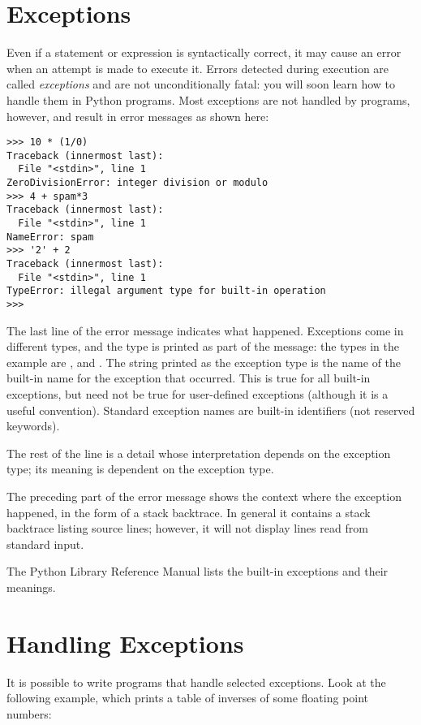 \section{Exceptions}

Even if a statement or expression is syntactically correct, it may
cause an error when an attempt is made to execute it.
Errors detected during execution are called \emph{exceptions} and are
not unconditionally fatal: you will soon learn how to handle them in
Python programs.  Most exceptions are not handled by programs,
however, and result in error messages as shown here:

\bcode\small\begin{verbatim}
>>> 10 * (1/0)
Traceback (innermost last):
  File "<stdin>", line 1
ZeroDivisionError: integer division or modulo
>>> 4 + spam*3
Traceback (innermost last):
  File "<stdin>", line 1
NameError: spam
>>> '2' + 2
Traceback (innermost last):
  File "<stdin>", line 1
TypeError: illegal argument type for built-in operation
>>> 
\end{verbatim}\normalsize\ecode
%
The last line of the error message indicates what happened.
Exceptions come in different types, and the type is printed as part of
the message: the types in the example are
,
and
.
The string printed as the exception type is the name of the built-in
name for the exception that occurred.  This is true for all built-in
exceptions, but need not be true for user-defined exceptions (although
it is a useful convention).
Standard exception names are built-in identifiers (not reserved
keywords).

The rest of the line is a detail whose interpretation depends on the
exception type; its meaning is dependent on the exception type.

The preceding part of the error message shows the context where the
exception happened, in the form of a stack backtrace.
In general it contains a stack backtrace listing source lines; however,
it will not display lines read from standard input.

The Python Library Reference Manual lists the built-in exceptions and
their meanings.

\section{Handling Exceptions}

It is possible to write programs that handle selected exceptions.
Look at the following example, which prints a table of inverses of
some floating point numbers:

